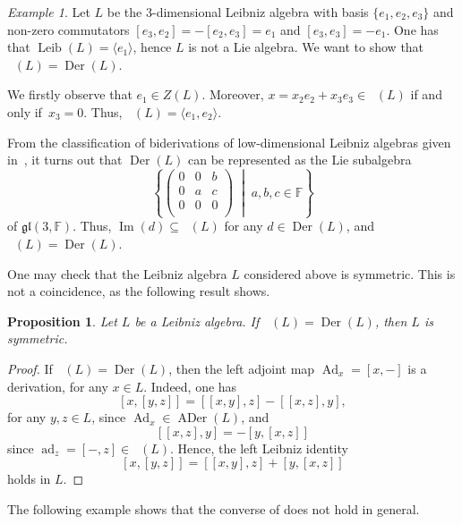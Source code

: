 \documentclass[11pt,a4paper]{amsart}
\theoremstyle{plain}
\newtheorem{proposition}[subsection]{Proposition}
\theoremstyle{definition}
\theoremstyle{remark}
\newtheorem{example}[subsection]{Example}
\numberwithin{equation}{section}
\newcommand{\0}{\emptyset}
\newcommand{\bF}{\mathbb{F}}
\DeclareMathOperator{\Imm}{Im}
\DeclareMathOperator{\Der}{Der}
\DeclareMathOperator{\DerL}{Der_{Lie}}
\DeclareMathOperator{\ADer}{ADer}
\DeclareMathOperator{\ad}{ad}
\DeclareMathOperator{\Ad}{Ad}
\DeclareMathOperator{\Leib}{Leib}
\DeclareMathOperator{\ZL}{Z_{Lie}}
\begin{document}
\begin{example}
Let $L$ be the $3$-dimensional Leibniz algebra with basis $\lbrace e_1,e_2,e_3 \rbrace$ and non-zero commutators $[e_3,e_2]=-[e_2,e_3]=e_1$ and $[e_3,e_3]=-e_1$. One has that $\Leib(L)=\langle e_1 \rangle$, hence $L$ is not a Lie algebra. We want to show that $\DerL(L)=\Der(L)$.
	
We firstly observe that $e_1 \in Z(L)$. Moreover, $x=x_2 e_2 + x_3 e_3 \in \ZL(L)$ if and only if~$x_3=0$. Thus, $\ZL(L)=\langle e_1,e_2 \rangle$.
	
From the classification of biderivations of low-dimensional Leibniz algebras given in~\cite{ManciniBider}, it turns out that $\Der(L)$ can be represented as the Lie subalgebra
\[
\left\lbrace
\begin{pmatrix}
0 & 0 & b \\
0 & a & c \\
0 & 0 & 0 \\
\end{pmatrix} \; \middle| \; a,b,c \in \bF \right\rbrace
\]
of $\mathfrak{gl}(3,\bF)$. Thus, $\Imm(d) \subseteq \ZL(L)$ for any $d \in \Der(L)$, and $\DerL(L)=\Der(L)$.
\end{example}

One may check that the Leibniz algebra $L$ considered above is symmetric. This is not a coincidence, as the following result shows.

\begin{proposition}\label{prop_sym}
Let $L$ be a Leibniz algebra. If $\DerL(L)=\Der(L)$, then $L$ is symmetric.
\end{proposition}

\begin{proof}
If $\DerL(L)=\Der(L)$, then the left adjoint map $\Ad_x=[x,-]$ is a derivation, for any $x \in L$. Indeed, one has
\[
[x,[y,z]]=[[x,y],z]-[[x,z],y],
\]
for any $y,z \in L$, since $\Ad_x \in \ADer(L)$, and
\[
[[x,z],y]=-[y,[x,z]]
\]
since $\ad_z=[-,z] \in \DerL(L)$. Hence, the left Leibniz identity
\[
[x,[y,z]]=[[x,y],z]+[y,[x,z]]
\]
holds in $L$.
\end{proof}

The following example shows that the converse of  does not hold in general.
\end{document}
